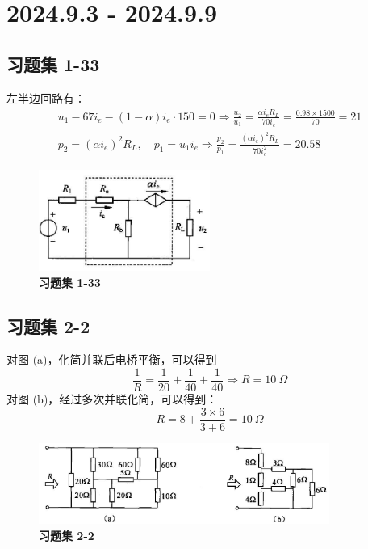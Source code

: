 \documentclass[UTF8]{report}
\theoremstyle{MyLineTheoremStyle} %
\theoremstyle{MyBlockTheoremStyle} %
\theoremstyle{MySubsubsectionStyle} %
\begin{document}
\chapter{2024.9.3 - 2024.9.9}\thispagestyle{fancy}

\section{习题集 1-33}
左半边回路有：
\begin{gather*}
u_1 - 67i_e - (1-\alpha)i_e \cdot 150 = 0 \Longrightarrow \frac{u_2}{u_1} = \frac{\alpha i_eR_L }{70i_e} = \frac{0.98\times 1500}{70} = 21 \\ 
p_2 = (\alpha i_e)^2R_L, \quad p_1 = u_1 i_e \Longrightarrow \frac{p_2}{p_1} = \frac{(\alpha i_e)^2R_L}{70i_e^2} = 20.58
\end{gather*}

\begin{figure}[H]\centering
\includegraphics[width=0.5\textwidth]{assets/2/image (47).jpg}
\caption{\textbf{习题集 1-33}}
\end{figure}


\section{习题集 2-2}
对图 (a)，化简并联后电桥平衡，可以得到
\begin{equation*}
\frac{1}{R} = \frac{1}{20 } + \frac{1}{40} +\frac{1}{40} \Longrightarrow R = 10\ \Omega
\end{equation*}
对图 (b)，经过多次并联化简，可以得到：
\begin{equation}
R = 8 + \frac{3\times 6}{3+6}=10\ \Omega
\end{equation}
\begin{figure}[H]\centering
\includegraphics[width=0.85\textwidth]{assets/2/e02c39d3f229a4b6352b828e57c3737f.jpg}
\caption{\textbf{习题集 2-2}}
\end{figure}
\end{document}
